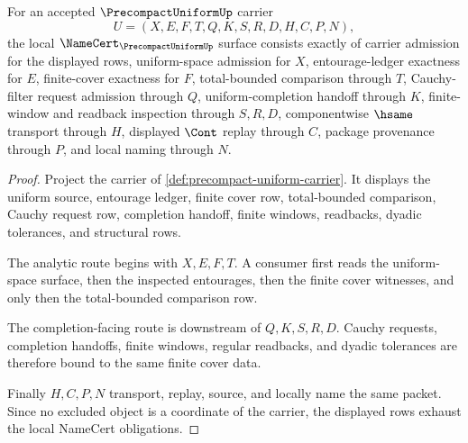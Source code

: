 \begin{theorem}
\label{thm:precompact-uniform-namecert-obligations}
For an accepted $\PrecompactUniformUp$ carrier
$$
U=(X,E,F,T,Q,K,S,R,D,H,C,P,N),
$$
the local $\NameCert_{\PrecompactUniformUp}$ surface consists exactly of carrier admission for the displayed rows, uniform-space admission for $X$, entourage-ledger exactness for $E$, finite-cover exactness for $F$, total-bounded comparison through $T$, Cauchy-filter request admission through $Q$, uniform-completion handoff through $K$, finite-window and readback inspection through $S,R,D$, componentwise $\hsame$ transport through $H$, displayed $\Cont$ replay through $C$, package provenance through $P$, and local naming through $N$.
\end{theorem}
\begin{proof}
Project the carrier of \autoref{def:precompact-uniform-carrier}. It displays the uniform source, entourage ledger, finite cover row, total-bounded comparison, Cauchy request row, completion handoff, finite windows, readbacks, dyadic tolerances, and structural rows.

The analytic route begins with $X,E,F,T$. A consumer first reads the uniform-space surface, then the inspected entourages, then the finite cover witnesses, and only then the total-bounded comparison row.

The completion-facing route is downstream of $Q,K,S,R,D$. Cauchy requests, completion handoffs, finite windows, regular readbacks, and dyadic tolerances are therefore bound to the same finite cover data.

Finally $H,C,P,N$ transport, replay, source, and locally name the same packet. Since no excluded object is a coordinate of the carrier, the displayed rows exhaust the local NameCert obligations.
\end{proof}


